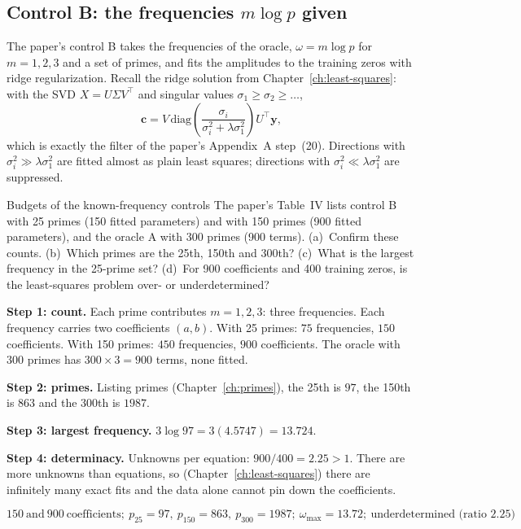 \subsection{Control B: the frequencies $m\log p$ given}

The paper's control B takes the frequencies of the oracle, $\omega=m\log p$ for $m=1,2,3$ and a set of primes, and fits the amplitudes to the training zeros with ridge regularization. Recall the ridge solution from Chapter~\ref{ch:least-squares}: with the SVD $X=U\Sigma V^\top$ and singular values $\sigma_1\ge\sigma_2\ge\dots$,
\begin{equation}
\bm c=V\,\mathrm{diag}\!\left(\frac{\sigma_i}{\sigma_i^2+\lambda\sigma_1^2}\right)U^\top\bm y ,
\label{eq:sparse-frequency-ridge}
\end{equation}
which is exactly the filter of the paper's Appendix~A step~(20). Directions with $\sigma_i^2\gg\lambda\sigma_1^2$ are fitted almost as plain least squares; directions with $\sigma_i^2\ll\lambda\sigma_1^2$ are suppressed.

\begin{sample}{Budgets of the known-frequency controls}
The paper's Table~IV lists control B with 25 primes (150 fitted parameters) and with 150 primes (900 fitted parameters), and the oracle A with 300 primes (900 terms). (a)~Confirm these counts. (b)~Which primes are the 25th, 150th and 300th? (c)~What is the largest frequency in the 25-prime set? (d)~For 900 coefficients and 400 training zeros, is the least-squares problem over- or underdetermined?

\textbf{Step 1: count.} Each prime contributes $m=1,2,3$: three frequencies. Each frequency carries two coefficients $(a,b)$. With 25 primes: $75$ frequencies, $150$ coefficients. With 150 primes: $450$ frequencies, $900$ coefficients. The oracle with 300 primes has $300\times3=900$ terms, none fitted.

\textbf{Step 2: primes.} Listing primes (Chapter~\ref{ch:primes}), the 25th is $97$, the 150th is $863$ and the 300th is $1987$.

\textbf{Step 3: largest frequency.} $3\log97=3(4.5747)=13.724$.

\textbf{Step 4: determinacy.} Unknowns per equation: $900/400=2.25>1$. There are more unknowns than equations, so (Chapter~\ref{ch:least-squares}) there are infinitely many exact fits and the data alone cannot pin down the coefficients.

$$\boxed{150\ \text{and}\ 900\ \text{coefficients};\ p_{25}=97,\ p_{150}=863,\ p_{300}=1987;\ \omega_{\max}=13.72;\ \text{underdetermined (ratio }2.25)}$$
\end{sample}

